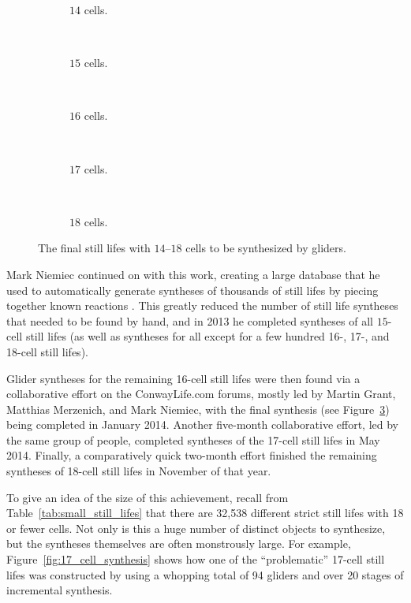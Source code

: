 \begin{figure}[!ht]
	\centering
	\begin{subfigure}{.17\textwidth}
		\centering{}
		\caption{$14$ cells.}\label{fig:14_cell_synth}
	\end{subfigure} \ \ \ \ %
	\begin{subfigure}{.17\textwidth}
		\centering{}
		\caption{$15$ cells.}\label{fig:15_cell_synth}
	\end{subfigure} \ \ \ \ %
	\begin{subfigure}{.17\textwidth}
		\centering{}
		\caption{$16$ cells.}\label{fig:16_cell_synth}
	\end{subfigure} \ \ \ \ %
	\begin{subfigure}{.17\textwidth}
		\centering{}
		\caption{$17$ cells.}\label{fig:17_cell_synth}
	\end{subfigure} \ \ \ \ %
	\begin{subfigure}{.17\textwidth}
		\centering{}
		\caption{$18$ cells.}\label{fig:18_cell_synth}
	\end{subfigure}
	\caption{The final still lifes with $14$--$18$ cells to be synthesized by gliders.}\label{fig:hard_to_synth_sls}
\end{figure}

Mark Niemiec continued on with this work, creating a large database that he used to automatically generate syntheses of thousands of still lifes by piecing together known reactions \cite{Nie03,Nie10}. This greatly reduced the number of still life syntheses that needed to be found by hand, and in 2013 he completed syntheses of all $15$-cell still lifes (as well as syntheses for all except for a few hundred 16-, 17-, and 18-cell still lifes).

Glider syntheses for the remaining 16-cell still lifes were then found via a collaborative effort on the ConwayLife.com forums, mostly led by Martin Grant, Matthias Merzenich, and Mark Niemiec, with the final synthesis (see Figure~\ref{fig:16_cell_synth}) being completed in January 2014. Another five-month collaborative effort, led by the same group of people, completed syntheses of the 17-cell still lifes in May 2014. Finally, a comparatively quick two-month effort finished the remaining syntheses of 18-cell still lifes in November of that year.

To give an idea of the size of this achievement, recall from Table~\ref{tab:small_still_lifes} that there are 32,538 different strict still lifes with 18 or fewer cells. Not only is this a huge number of distinct objects to synthesize, but the syntheses themselves are often monstrously large. For example, Figure~\ref{fig:17_cell_synthesis} shows how one of the ``problematic'' 17-cell still lifes was constructed by using a whopping total of 94 gliders and over 20 stages of incremental synthesis.

